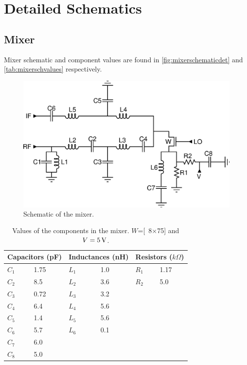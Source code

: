 \chapter{Detailed Schematics}
	\section{Mixer}\label{sec:detmixersch}
		Mixer schematic and component values are found in \autoref{fig:mixerschematicdet} and \autoref{tab:mixerschvalues} respectively.
		
		\begin{figure}[h!]
			\centering
			\includegraphics[width=1.0\textwidth]{fig/schematics/sch_mixer_labels}
			\caption[Mixer schematic.]{Schematic of the mixer.}\label{fig:mixerschematicdet}
		\end{figure}

		\begin{table}[h!]
			\caption[Mixer component values.]{Values of the components in the mixer. $W$=\unit[8$\times$75]{\mum} and $V=\unit[5]{V}$.}
			\label{tab:mixerschvalues}
			\centering
			\begin{tabular}{llllll}
				\multicolumn{2}{l}{Capacitors (pF)} & \multicolumn{2}{l}{Inductances (nH)} & \multicolumn{2}{l}{Resistors ($k\Omega$)} \\\hline
				$C_1$ & 1.75 & $L_1$ & 1.0 & $R_1$ & 1.17 \\
				$C_2$ & 8.5 & $L_2$ & 3.6 & $R_2$ & 5.0 \\
				$C_3$ & 0.72 & $L_3$ & 3.2 &  & \\
				$C_4$ & 6.4 & $L_4$ & 5.6 &  & \\
				$C_5$ & 1.4 & $L_5$ & 5.6 &  & \\
				$C_6$ & 5.7 & $L_6$ & 0.1 &  & \\
				$C_7$ & 6.0 &  &  &  & \\
				$C_8$ & 5.0 &  &  &  &
			\end{tabular}
		\end{table}
		
